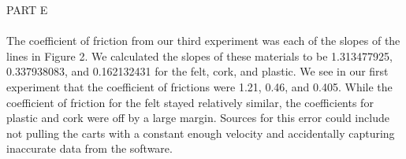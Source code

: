 \documentclass [12pt, letterpaper, twoside] {article}
\begin{document}
\noindent

\noindent
PART E \\\\
The coefficient of friction from our third experiment was each of the slopes of the lines in Figure 2. We calculated the slopes of these materials to be 1.313477925, 0.337938083, and 0.162132431 for the felt, cork, and plastic. We see in our first experiment that the coefficient of frictions were 1.21, 0.46, and 0.405. While the coefficient of friction for the felt stayed relatively similar, the coefficients for plastic and cork were off by a large margin. Sources for this error could include not pulling the carts with a constant enough velocity and accidentally capturing inaccurate data from the software. \\\\
\end{document}
